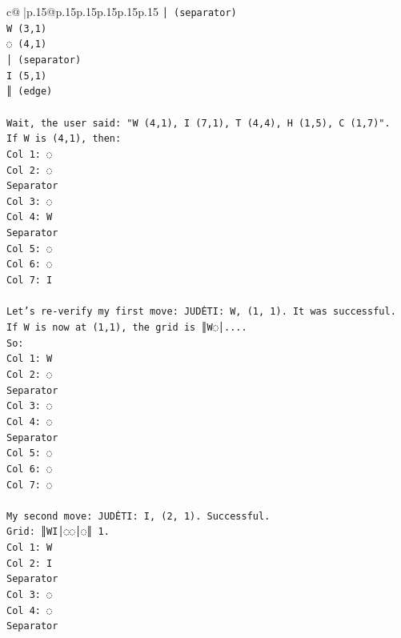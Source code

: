 \documentclass{article}
\begin{document}
{\begin{supertabular}{c@{$\;$}|p{.15\linewidth}@{}p{.15\linewidth}p{.15\linewidth}p{.15\linewidth}p{.15\linewidth}p{.15\linewidth}}
{{{\texttt{│ (separator)} \\
\texttt{W (3,1)} \\
\texttt{◌ (4,1)} \\
\texttt{│ (separator)} \\
\texttt{I (5,1)} \\
\texttt{║ (edge)} \\
\\ 
\texttt{Wait, the user said: "W (4,1), I (7,1), T (4,4), H (1,5), C (1,7)".} \\
\texttt{If W is (4,1), then:} \\
\texttt{Col 1: ◌} \\
\texttt{Col 2: ◌} \\
\texttt{Separator} \\
\texttt{Col 3: ◌} \\
\texttt{Col 4: W} \\
\texttt{Separator} \\
\texttt{Col 5: ◌} \\
\texttt{Col 6: ◌} \\
\texttt{Col 7: I} \\
\\ 
\texttt{Let's re{-}verify my first move: JUDĖTI: W, (1, 1). It was successful.} \\
\texttt{If W is now at (1,1), the grid is ║W◌│....} \\
\texttt{So:} \\
\texttt{Col 1: W} \\
\texttt{Col 2: ◌} \\
\texttt{Separator} \\
\texttt{Col 3: ◌} \\
\texttt{Col 4: ◌} \\
\texttt{Separator} \\
\texttt{Col 5: ◌} \\
\texttt{Col 6: ◌} \\
\texttt{Col 7: ◌} \\
\\ 
\texttt{My second move: JUDĖTI: I, (2, 1). Successful.} \\
\texttt{Grid: ║WI│◌◌│◌║ 1.} \\
\texttt{Col 1: W} \\
\texttt{Col 2: I} \\
\texttt{Separator} \\
\texttt{Col 3: ◌} \\
\texttt{Col 4: ◌} \\
\texttt{Separator} \\
}}}
\end{supertabular}}
\end{document}
